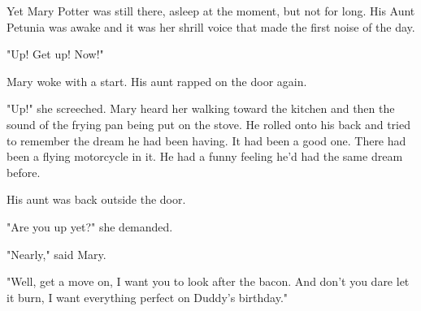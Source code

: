 Yet Mary Potter was still there, asleep at the moment, but not for long. His Aunt Petunia was awake and it was her shrill voice that made the first noise of the day. 

"Up! Get up! Now!" 

Mary woke with a start. His aunt rapped on the door again. 

"Up!" she screeched. Mary heard her walking toward the kitchen and then the sound of the frying pan being put on the stove. He rolled onto his back and tried to remember the dream he had been having. It had been a good one. There had been a flying motorcycle in it. He had a funny feeling he'd had the same dream before. 

His aunt was back outside the door. 

"Are you up yet?" she demanded. 

"Nearly," said Mary. 

"Well, get a move on, I want you to look after the bacon. And don't you dare let it burn, I want everything perfect on Duddy's birthday."
